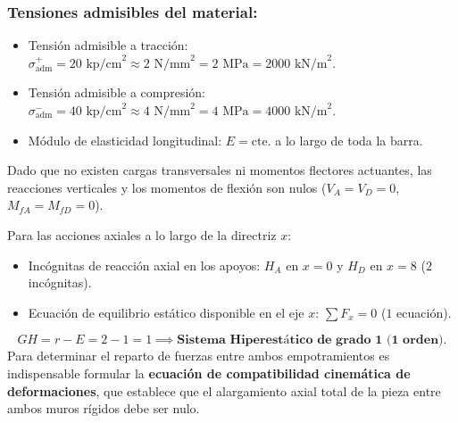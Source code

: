 \subsubsection*{Tensiones admisibles del material:}
\begin{itemize}
    \item Tensión admisible a tracción: $\sigma_{\text{adm}}^+ = 20\text{ kp/cm}^2 \approx 2\text{ N/mm}^2 = 2\text{ MPa} = 2000\text{ kN/m}^2$.
    \item Tensión admisible a compresión: $\sigma_{\text{adm}}^- = 40\text{ kp/cm}^2 \approx 4\text{ N/mm}^2 = 4\text{ MPa} = 4000\text{ kN/m}^2$.
    \item Módulo de elasticidad longitudinal: $E = \text{cte.}$ a lo largo de toda la barra.
\end{itemize}



Dado que no existen cargas transversales ni momentos flectores actuantes, las reacciones verticales y los momentos de flexión son nulos ($V_A = V_D = 0$, $M_{fA} = M_{fD} = 0$).

Para las acciones axiales a lo largo de la directriz $x$:
\begin{itemize}
    \item Incógnitas de reacción axial en los apoyos: $H_A$ en $x=0$ y $H_D$ en $x=8$ ($2$ incógnitas).
    \item Ecuación de equilibrio estático disponible en el eje $x$: $\sum F_x = 0$ ($1$ ecuación).
\end{itemize}
\begin{equation}
    GH = r - E = 2 - 1 = 1 \implies \textbf{Sistema Hiperestático de grado 1 (1 orden).}
\end{equation}
Para determinar el reparto de fuerzas entre ambos empotramientos es indispensable formular la \textbf{ecuación de compatibilidad cinemática de deformaciones}, que establece que el alargamiento axial total de la pieza entre ambos muros rígidos debe ser nulo.

